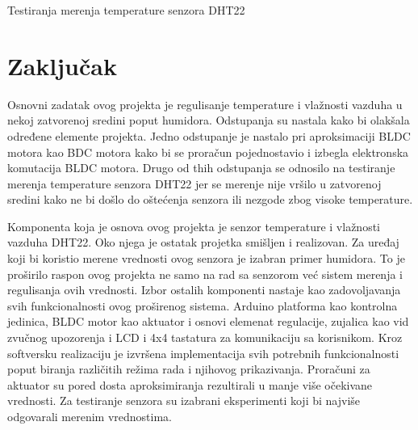 \documentclass[a4paper, 12pt]{article}
\begin{document}
\vspace{10pt}

\begin{grafik}
\begin{center}
\end{center}			
\caption{Testiranja merenja temperature senzora DHT22}\label{grafiik:tempB}
\end{grafik}


\pagebreak
\endgroup

\begingroup
\sloppy
\section{Zaključak}

\vspace{10pt}

Osnovni zadatak ovog projekta je regulisanje temperature i vlažnosti vazduha u nekoj zatvorenoj sredini poput humidora. Odstupanja su nastala kako bi olakšala određene elemente projekta. Jedno odstupanje je nastalo pri aproksimaciji BLDC motora kao BDC motora kako bi se proračun pojednostavio i izbegla elektronska komutacija BLDC motora. Drugo od thih odstupanja se odnosilo na testiranje merenja temperature senzora DHT22 jer se merenje nije vršilo u zatvorenoj sredini kako ne bi došlo do oštećenja senzora ili nezgode zbog visoke temperature.

\vspace{10pt}

Komponenta koja je osnova ovog projekta je senzor temperature i vlažnosti vazduha DHT22. Oko njega je ostatak projetka smišljen i realizovan. Za uređaj koji bi koristio merene vrednosti ovog senzora je izabran primer humidora. To je proširilo raspon ovog projekta ne samo na rad sa senzorom već sistem merenja i regulisanja ovih vrednosti. Izbor ostalih komponenti nastaje kao zadovoljavanja svih funkcionalnosti ovog proširenog sistema. Arduino platforma kao kontrolna jedinica, BLDC motor kao aktuator i osnovi elemenat regulacije, zujalica kao vid zvučnog upozorenja i LCD i 4x4 tastatura za komunikaciju sa korisnikom. Kroz softversku realizaciju je izvršena implementacija svih potrebnih funkcionalnosti poput biranja različitih režima rada i njihovog prikazivanja. Proračuni za aktuator su pored dosta aproksimiranja rezultirali u manje više očekivane vrednosti. Za testiranje senzora su izabrani eksperimenti koji bi najviše odgovarali merenim vrednostima.
\end{document}
